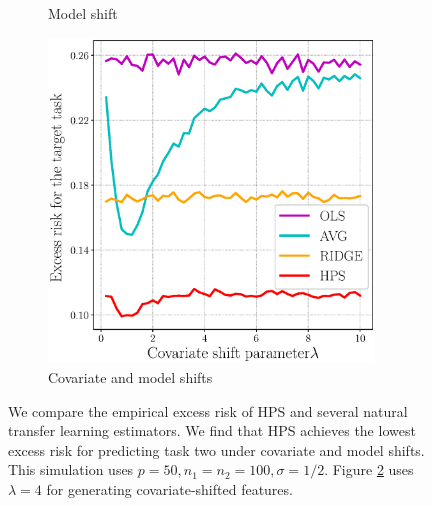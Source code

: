 \begin{figure}[!t]
\begin{subfigure}[b]{0.33\textwidth}
		\caption{Model shift}
		\label{fig_sec5_model}
	\end{subfigure}\hfill%
	\begin{subfigure}[b]{0.33\textwidth}
		\centering
		\includegraphics[width=0.95\textwidth]{figures/compare_risk_cov_model_shift.eps}
		\caption{Covariate and model shifts}
		\label{fig_sec5_cov_model}
	\end{subfigure}
	\caption{We compare the empirical excess risk of HPS and several natural transfer learning estimators. We find that HPS achieves the lowest excess risk for predicting task two under covariate and model shifts. This simulation uses $p = 50, n_1 = n_2 = 100, \sigma = 1/2$. Figure \ref{fig_sec5_cov_model} uses $\lambda = 4$ for generating covariate-shifted features.}
	\label{fig_sec51}
\end{figure}

